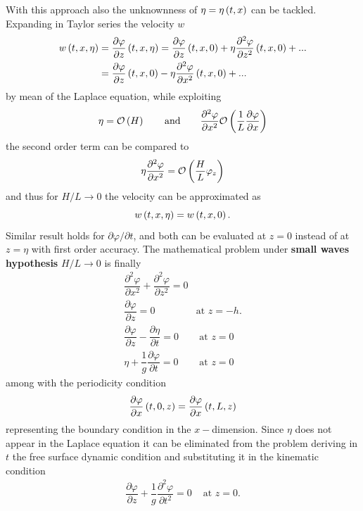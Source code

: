 With this approach also the unknownness of $\eta=\eta\left( t,x \right)$ can be tackled. Expanding in Taylor series the velocity $w$ 
\begin{align*}
w\left( t,x,\eta \right)&=\dfrac{\partial\varphi}{\partial z}\left( t,x,\eta \right)=\dfrac{\partial\varphi}{\partial z}\left( t,x,0 \right)+\eta\dfrac{\partial^{2}\varphi}{\partial z^{2}}\left( t,x,0 \right)+...\\
&=\dfrac{\partial\varphi}{\partial z}\left( t,x,0 \right)-\eta\dfrac{\partial^{2}\varphi}{\partial x^{2}}\left( t,x,0 \right)+...
\end{align*}
by mean of the Laplace equation, while exploiting 
\begin{equation*}
\eta=\mathcal{O}\left( H \right) \qquad \text{and} \qquad \dfrac{\partial^{2}\varphi}{\partial x^{2}}\mathcal{O}\left( \dfrac{1}{L}\dfrac{\partial\varphi}{\partial x} \right)
\end{equation*}
the second order term can be compared to
\begin{equation*}
\eta\dfrac{\partial^{2}\varphi}{\partial x^{2}}=\mathcal{O}\left( \dfrac{H}{L}\varphi_{z} \right)
\end{equation*}
and thus for $H/L\rightarrow 0$ the velocity can be approximated as
\begin{equation}
w\left( t,x,\eta \right)=w\left( t,x,0 \right).
\end{equation}
Similar result holds for $\partial\varphi/\partial t$, and both can be evaluated at $z=0$ instead of at $z=\eta$ with first order accuracy. The mathematical problem under \textbf{small waves hypothesis} $H/L\rightarrow 0$ is finally
\renewcommand{\arraystretch}{2.5}
\begin{equation*}
\begin{array}{ll}
\dfrac{\partial^{2} \varphi}{\partial x^{2}}+\dfrac{\partial^{2}\varphi}{\partial z^{2}}=0 & \\
\dfrac{\partial\varphi}{\partial z}=0 & \text{at } z=-h.\\
\dfrac{\partial\varphi}{\partial z}-\dfrac{\partial\eta}{\partial t}=0  & \text{ at } z=0 \\
\eta + \dfrac{1}{g}\dfrac{\partial \varphi}{\partial t}=0 & \text{ at } z=0
\end{array}
\end{equation*}
\renewcommand{\arraystretch}{1}
among with the periodicity condition
\begin{equation*}
\dfrac{\partial\varphi}{\partial x}\left( t,0,z \right)=\dfrac{\partial\varphi}{\partial x}\left( t,L,z \right)
\end{equation*}
representing the boundary condition in the $x-$dimension. Since $\eta$ does not appear in the Laplace equation it can be eliminated from the problem deriving in $t$ the free surface dynamic condition and substituting it in the kinematic condition 
\begin{equation*}
\begin{array}{ll}
\dfrac{\partial \varphi}{\partial z} + \dfrac{1}{g}\dfrac{\partial^{2} \varphi}{\partial t^{2}}=0 & \text{ at } z=0.
\end{array}
\end{equation*}
